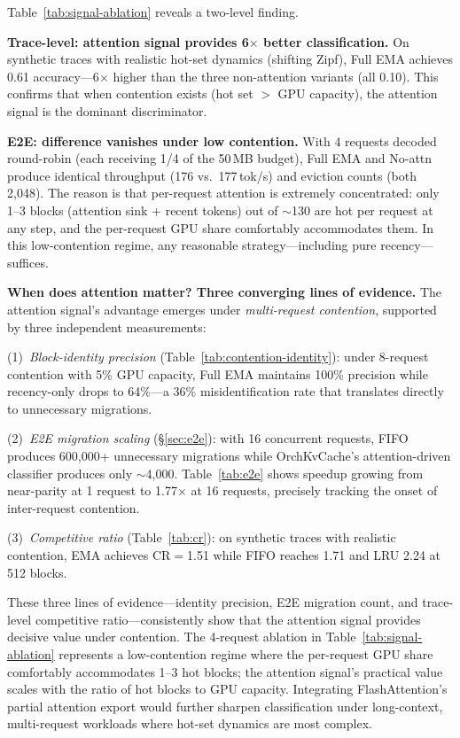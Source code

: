 \documentclass[conference]{IEEEtran}
\begin{document}
Table~\ref{tab:signal-ablation} reveals a two-level finding.

\textbf{Trace-level: attention signal provides 6$\times$ better classification.} On synthetic traces with realistic hot-set dynamics (shifting Zipf), Full EMA achieves 0.61 accuracy---6$\times$ higher than the three non-attention variants (all 0.10). This confirms that when contention exists (hot set $>$ GPU capacity), the attention signal is the dominant discriminator.

\textbf{E2E: difference vanishes under low contention.} With 4 requests decoded round-robin (each receiving 1/4 of the 50\,MB budget), Full EMA and No-attn produce identical throughput (176 vs.\ 177\,tok/s) and eviction counts (both 2,048). The reason is that per-request attention is extremely concentrated: only 1--3 blocks (attention sink + recent tokens) out of ${\sim}$130 are hot per request at any step, and the per-request GPU share comfortably accommodates them. In this low-contention regime, any reasonable strategy---including pure recency---suffices.

\textbf{When does attention matter? Three converging lines of evidence.} The attention signal's advantage emerges under \emph{multi-request contention}, supported by three independent measurements:

(1)~\emph{Block-identity precision} (Table~\ref{tab:contention-identity}): under 8-request contention with 5\% GPU capacity, Full EMA maintains 100\% precision while recency-only drops to 64\%---a 36\% misidentification rate that translates directly to unnecessary migrations.

(2)~\emph{E2E migration scaling} (\S\ref{sec:e2e}): with 16 concurrent requests, FIFO produces 600,000+ unnecessary migrations while OrchKvCache's attention-driven classifier produces only ${\sim}$4,000. Table~\ref{tab:e2e} shows speedup growing from near-parity at 1 request to 1.77$\times$ at 16 requests, precisely tracking the onset of inter-request contention.

(3)~\emph{Competitive ratio} (Table~\ref{tab:cr}): on synthetic traces with realistic contention, EMA achieves CR$=$1.51 while FIFO reaches 1.71 and LRU 2.24 at 512 blocks.

These three lines of evidence---identity precision, E2E migration count, and trace-level competitive ratio---consistently show that the attention signal provides decisive value under contention. The 4-request ablation in Table~\ref{tab:signal-ablation} represents a low-contention regime where the per-request GPU share comfortably accommodates 1--3 hot blocks; the attention signal's practical value scales with the ratio of hot blocks to GPU capacity. Integrating FlashAttention's partial attention export would further sharpen classification under long-context, multi-request workloads where hot-set dynamics are most complex.
\end{document}
